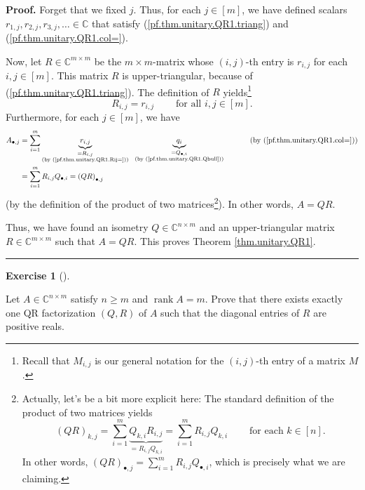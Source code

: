 \documentclass[numbers=enddot,12pt,final,onecolumn,notitlepage]{scrartcl}%
\newcounter{exer}
\numberwithin{exer}{subsection}
\theoremstyle{definition}
\newtheorem{exmp}[exer]{Exercise}
\newenvironment{exercise}[1][]
{\begin{exmp}[#1]\begin{leftbar}}
{\end{leftbar}\end{exmp}}
\newenvironment{proof}[1][Proof]{\noindent\textbf{#1.} }{\ \rule{0.5em}{0.5em}}
\let\sumnonlimits\sum
\renewcommand{\sum}{\sumnonlimits\limits}
\begin{document}
\begin{proof}
Forget that we fixed $j$. Thus, for each $j\in\left[  m\right]  $, we have
defined scalars $r_{1,j},r_{2,j},r_{3,j},\ldots\in\mathbb{C}$ that satisfy
(\ref{pf.thm.unitary.QR1.triang}) and (\ref{pf.thm.unitary.QR1.col=}).

Now, let $R\in\mathbb{C}^{m\times m}$ be the $m\times m$-matrix whose $\left(
i,j\right)  $-th entry is $r_{i,j}$ for each $i,j\in\left[  m\right]  $. This
matrix $R$ is upper-triangular, because of (\ref{pf.thm.unitary.QR1.triang}).
The definition of $R$ yields\footnote{Recall that $M_{i,j}$ is our general
notation for the $\left(  i,j\right)  $-th entry of a matrix $M$.}%
\begin{equation}
R_{i,j}=r_{i,j}\ \ \ \ \ \ \ \ \ \ \text{for all }i,j\in\left[  m\right]  .
\label{pf.thm.unitary.QR1.Rij=}%
\end{equation}
Furthermore, for each $j\in\left[  m\right]  $, we have%
\begin{align*}
A_{\bullet,j}  &  =\sum_{i=1}^{m}\underbrace{r_{i,j}}_{\substack{=R_{i,j}%
\\\text{(by (\ref{pf.thm.unitary.QR1.Rij=}))}}}\ \ \underbrace{q_{i}%
}_{\substack{=Q_{\bullet,i}\\\text{(by (\ref{pf.thm.unitary.QR1.Qbull}))}%
}}\ \ \ \ \ \ \ \ \ \ \left(  \text{by (\ref{pf.thm.unitary.QR1.col=})}\right)
\\
&  =\sum_{i=1}^{m}R_{i,j}Q_{\bullet,i}=\left(  QR\right)  _{\bullet,j}%
\end{align*}
(by the definition of the product of two matrices\footnote{Actually, let's be
a bit more explicit here: The standard definition of the product of two
matrices yields%
\[
\left(  QR\right)  _{k,j}=\sum_{i=1}^{m}\underbrace{Q_{k,i}R_{i,j}}%
_{=R_{i,j}Q_{k,i}}=\sum_{i=1}^{m}R_{i,j}Q_{k,i}\ \ \ \ \ \ \ \ \ \ \text{for
each }k\in\left[  n\right]  .
\]
In other words, $\left(  QR\right)  _{\bullet,j}=\sum_{i=1}^{m}R_{i,j}%
Q_{\bullet,i}$, which is precisely what we are claiming.}). In other words,
$A=QR$.

Thus, we have found an isometry $Q\in\mathbb{C}^{n\times m}$ and an
upper-triangular matrix $R\in\mathbb{C}^{m\times m}$ such that $A=QR$. This
proves Theorem \ref{thm.unitary.QR1}.
\end{proof}

\begin{exercise}
\label{exe.unitary.QR2-uni} Let $A\in\mathbb{C}^{n\times m}$ satisfy
$n\geq m$ and $\operatorname*{rank}A=m$. Prove that there exists exactly one
QR factorization $\left(  Q,R\right)  $ of $A$ such that the diagonal entries
of $R$ are positive reals.
\end{exercise}
\end{document}
